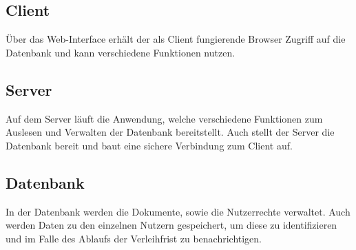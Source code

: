 \subsection{Client}
Über das Web-Interface erhält der als Client fungierende Browser Zugriff auf die Datenbank und kann verschiedene Funktionen nutzen.

\subsection{Server}
Auf dem Server läuft die Anwendung, welche verschiedene Funktionen zum Auslesen und Verwalten der Datenbank bereitstellt. 
Auch stellt der Server die Datenbank bereit und baut eine sichere Verbindung zum Client auf.

\subsection{Datenbank}
In der Datenbank werden die Dokumente, sowie die Nutzerrechte verwaltet.
Auch werden Daten zu den einzelnen Nutzern gespeichert, um diese zu identifizieren und im Falle des Ablaufs der Verleihfrist zu benachrichtigen.
